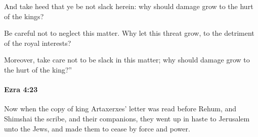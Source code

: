 			\begin{versebox}
					\item[BHS] 
					\item[LXX] 
					\item[ASV] And take heed that ye be not slack herein: why should damage grow to the hurt of the kings?
					\item[NIV] Be careful not to neglect this matter. Why let this threat grow, to the detriment of the royal interests?
					\item[NRSV] Moreover, take care not to be slack in this matter; why should damage grow to the hurt of the king?”
			\end{versebox}

		\paragraph{Ezra 4:23} %
			\label{EZRA-4-23}

			Now when the copy of king Artaxerxes’ letter was read before Rehum, and Shimshai the scribe, and their companions, they went up in haste to Jerusalem unto the Jews, and made them to cease by force and power.

